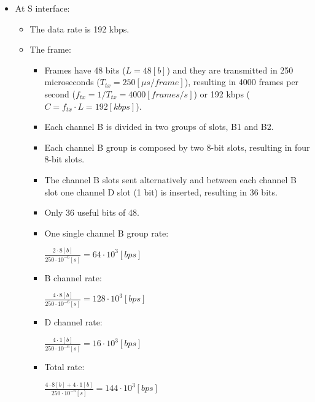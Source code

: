 \documentclass[../main.tex]{subfiles}
\begin{document}
\begin{itemize}
	\item {
		At S interface:
		\begin{itemize}
			\item The data rate is 192 kbps.
			\item {
				The frame:
				\begin{itemize}
					\item Frames have 48 bits ($L = 48 [b] $) and they are transmitted in 250 microseconds ($T_{tx} = 250 [\mu s/frame]$), resulting in 4000 frames per second ($f_{tx} = 1/T_{tx} = 4000 [frames/s]$) or 192 kbps ($C = f_{tx} \cdot L = 192 [kbps]$).
					\item Each channel B is divided in two groups of slots, B1 and B2.
					\item Each channel B group is composed by two 8-bit slots, resulting in four 8-bit slots.
					\item The channel B slots sent alternatively and between each channel B slot one channel D slot (1 bit) is inserted, resulting in 36 bits.
					\item Only 36 useful bits of 48.
					\item {
						One single channel B group rate:

						$
							\frac {2 \cdot 8 [b]} {250 \cdot 10^{-6} [s]} = 64 \cdot 10^3 [bps]
						$
					}
					\item {
						B channel rate:

						$
							\frac {4 \cdot 8 [b]} {250 \cdot 10^{-6} [s]} = 128 \cdot 10^3 [bps]
						$
					}
					\item {
						D channel rate:

						$
							\frac {4 \cdot 1 [b]} {250 \cdot 10^{-6} [s]} = 16 \cdot 10^3 [bps]
						$
					}
					\item {
						Total rate:

						$
							\frac {4 \cdot 8 [b] + 4 \cdot 1 [b]} {250 \cdot 10^{-6} [s]} = 144 \cdot 10^3 [bps]
						$
					}
				\end{itemize}

}
\end{itemize}}
\end{itemize}
\end{document}
